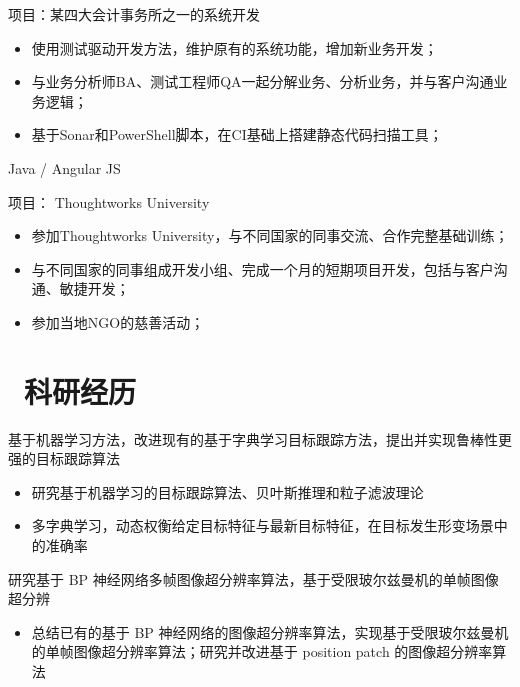 \documentclass{resume}
\begin{document}
项目：某四大会计事务所之一的系统开发
\begin{itemize}
  \item 使用测试驱动开发方法，维护原有的系统功能，增加新业务开发；
  \item 与业务分析师BA、测试工程师QA一起分解业务、分析业务，并与客户沟通业务逻辑；
  \item 基于Sonar和PowerShell脚本，在CI基础上搭建静态代码扫描工具；
\end{itemize}

Java / Angular JS

项目： Thoughtworks University
\begin{itemize}
  \item 参加Thoughtworks University，与不同国家的同事交流、合作完整基础训练；
  \item 与不同国家的同事组成开发小组、完成一个月的短期项目开发，包括与客户沟通、敏捷开发；
  \item 参加当地NGO的慈善活动；
\end{itemize}


\section{\faUsers\ 科研经历}

\begin{onehalfspacing}
基于机器学习方法，改进现有的基于字典学习目标跟踪方法，提出并实现鲁棒性更强的目标跟踪算法
\begin{itemize}
  \item 研究基于机器学习的目标跟踪算法、贝叶斯推理和粒子滤波理论
  \item 多字典学习，动态权衡给定目标特征与最新目标特征，在目标发生形变场景中的准确率
\end{itemize}
\end{onehalfspacing}

\begin{onehalfspacing}
研究基于 BP 神经网络多帧图像超分辨率算法，基于受限玻尔兹曼机的单帧图像超分辨
\begin{itemize}
  \item 总结已有的基于 BP 神经网络的图像超分辨率算法，实现基于受限玻尔兹曼机的单帧图像超分辨率算法；研究并改进基于 position patch 的图像超分辨率算法
\end{itemize}
\end{onehalfspacing}
\end{document}
